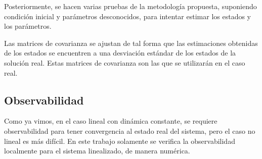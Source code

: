Posteriormente, se hacen varias pruebas de la metodología propuesta, suponiendo condición inicial y parámetros desconocidos, para intentar estimar los estados y los parámetros. 


Las matrices de covarianza se ajustan de tal forma que las estimaciones obtenidas de los estados se encuentren a una desviación estándar de los estados de la solución real. Estas matrices de covarianza son las que se utilizarán en el caso real.





\subsection{Observabilidad}

Como ya vimos, en el caso lineal con dinámica constante, se requiere observabilidad para tener convergencia al estado real del sistema, pero el caso no lineal es más difícil. En este trabajo solamente se verifica la observabilidad localmente para el sistema linealizado, de manera numérica. 




